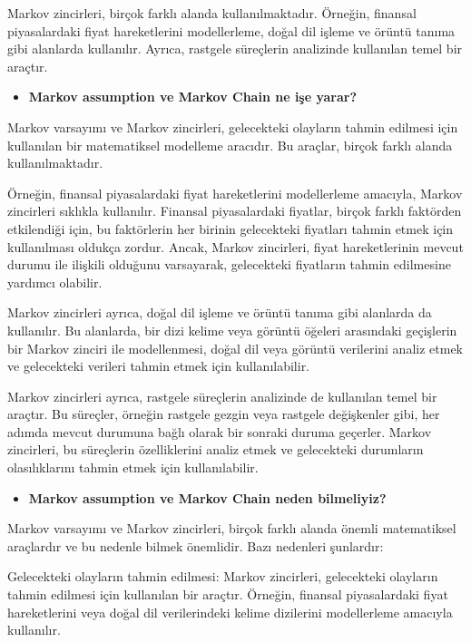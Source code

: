 \documentclass[11pt]{article}
\begin{document}
Markov zincirleri, birçok farklı alanda kullanılmaktadır. Örneğin, finansal piyasalardaki fiyat hareketlerini modellerleme, doğal dil işleme ve örüntü tanıma gibi alanlarda kullanılır. Ayrıca, rastgele süreçlerin analizinde kullanılan temel bir araçtır.

\begin{itemize}
    \item \textbf{Markov assumption ve Markov Chain ne işe yarar?}
\end{itemize}

Markov varsayımı ve Markov zincirleri, gelecekteki olayların tahmin edilmesi için kullanılan bir matematiksel modelleme aracıdır. Bu araçlar, birçok farklı alanda kullanılmaktadır.

Örneğin, finansal piyasalardaki fiyat hareketlerini modellerleme amacıyla, Markov zincirleri sıklıkla kullanılır. Finansal piyasalardaki fiyatlar, birçok farklı faktörden etkilendiği için, bu faktörlerin her birinin gelecekteki fiyatları tahmin etmek için kullanılması oldukça zordur. Ancak, Markov zincirleri, fiyat hareketlerinin mevcut durumu ile ilişkili olduğunu varsayarak, gelecekteki fiyatların tahmin edilmesine yardımcı olabilir.

Markov zincirleri ayrıca, doğal dil işleme ve örüntü tanıma gibi alanlarda da kullanılır. Bu alanlarda, bir dizi kelime veya görüntü öğeleri arasındaki geçişlerin bir Markov zinciri ile modellenmesi, doğal dil veya görüntü verilerini analiz etmek ve gelecekteki verileri tahmin etmek için kullanılabilir.

Markov zincirleri ayrıca, rastgele süreçlerin analizinde de kullanılan temel bir araçtır. Bu süreçler, örneğin rastgele gezgin veya rastgele değişkenler gibi, her adımda mevcut durumuna bağlı olarak bir sonraki duruma geçerler. Markov zincirleri, bu süreçlerin özelliklerini analiz etmek ve gelecekteki durumların olasılıklarını tahmin etmek için kullanılabilir.

\begin{itemize}
    \item \textbf{Markov assumption ve Markov Chain neden bilmeliyiz?}
\end{itemize}

Markov varsayımı ve Markov zincirleri, birçok farklı alanda önemli matematiksel araçlardır ve bu nedenle bilmek önemlidir. Bazı nedenleri şunlardır:

Gelecekteki olayların tahmin edilmesi: Markov zincirleri, gelecekteki olayların tahmin edilmesi için kullanılan bir araçtır. Örneğin, finansal piyasalardaki fiyat hareketlerini veya doğal dil verilerindeki kelime dizilerini modellerleme amacıyla kullanılır.
\end{document}
